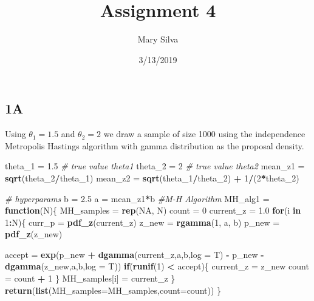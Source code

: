\documentclass[]{article}
\title{Assignment 4}
\author{Mary Silva}
\date{3/13/2019}
\newenvironment{Shaded}{\begin{snugshade}}{\end{snugshade}}
\newcommand{\KeywordTok}[1]{\textcolor[rgb]{0.13,0.29,0.53}{\textbf{#1}}}
\newcommand{\DataTypeTok}[1]{\textcolor[rgb]{0.13,0.29,0.53}{#1}}
\newcommand{\DecValTok}[1]{\textcolor[rgb]{0.00,0.00,0.81}{#1}}
\newcommand{\FloatTok}[1]{\textcolor[rgb]{0.00,0.00,0.81}{#1}}
\newcommand{\StringTok}[1]{\textcolor[rgb]{0.31,0.60,0.02}{#1}}
\newcommand{\CommentTok}[1]{\textcolor[rgb]{0.56,0.35,0.01}{\textit{#1}}}
\newcommand{\OtherTok}[1]{\textcolor[rgb]{0.56,0.35,0.01}{#1}}
\newcommand{\ControlFlowTok}[1]{\textcolor[rgb]{0.13,0.29,0.53}{\textbf{#1}}}
\newcommand{\OperatorTok}[1]{\textcolor[rgb]{0.81,0.36,0.00}{\textbf{#1}}}
\newcommand{\NormalTok}[1]{#1}
\begin{document}
\maketitle

\subsection{1A}\label{a}

Using \(\theta_1 = 1.5\) and \(\theta_2 = 2\) we draw a sample of size
1000 using the independence Metropolis Hastings algorithm with gamma
distribution as the proposal density.

\begin{Shaded}
\begin{Highlighting}[]
\NormalTok{theta_}\DecValTok{1}\NormalTok{ =}\StringTok{ }\FloatTok{1.5} \CommentTok{# true value theta1}
\NormalTok{theta_}\DecValTok{2}\NormalTok{ =}\StringTok{ }\DecValTok{2} \CommentTok{# true value theta2}
\NormalTok{mean_z1 =}\StringTok{ }\KeywordTok{sqrt}\NormalTok{(theta_}\DecValTok{2}\OperatorTok{/}\NormalTok{theta_}\DecValTok{1}\NormalTok{)}
\NormalTok{mean_z2 =}\StringTok{ }\KeywordTok{sqrt}\NormalTok{(theta_}\DecValTok{1}\OperatorTok{/}\NormalTok{theta_}\DecValTok{2}\NormalTok{) }\OperatorTok{+}\StringTok{ }\DecValTok{1}\OperatorTok{/}\NormalTok{(}\DecValTok{2}\OperatorTok{*}\NormalTok{theta_}\DecValTok{2}\NormalTok{)}

\CommentTok{# hyperparams}
\NormalTok{b =}\StringTok{ }\FloatTok{2.5}
\NormalTok{a =}\StringTok{ }\NormalTok{mean_z1}\OperatorTok{*}\NormalTok{b}
\CommentTok{#M-H Algorithm}
\NormalTok{MH_alg1 =}\StringTok{ }\ControlFlowTok{function}\NormalTok{(N)\{}
\NormalTok{  MH_samples =}\StringTok{ }\KeywordTok{rep}\NormalTok{(}\OtherTok{NA}\NormalTok{, N)}
\NormalTok{  count =}\StringTok{ }\DecValTok{0}
\NormalTok{  current_z =}\StringTok{ }\FloatTok{1.0}
  \ControlFlowTok{for}\NormalTok{(i }\ControlFlowTok{in} \DecValTok{1}\OperatorTok{:}\NormalTok{N)\{}
\NormalTok{    curr_p =}\StringTok{ }\KeywordTok{pdf_z}\NormalTok{(current_z) }
\NormalTok{    z_new =}\StringTok{ }\KeywordTok{rgamma}\NormalTok{(}\DecValTok{1}\NormalTok{, a, b)}
\NormalTok{    p_new =}\StringTok{ }\KeywordTok{pdf_z}\NormalTok{(z_new)}
    
\NormalTok{    accept =}\StringTok{ }\KeywordTok{exp}\NormalTok{(p_new }\OperatorTok{+}\StringTok{ }\KeywordTok{dgamma}\NormalTok{(current_z,a,b,}\DataTypeTok{log =}\NormalTok{ T) }\OperatorTok{-}\StringTok{ }
\StringTok{                   }\NormalTok{p_new }\OperatorTok{-}\StringTok{ }\KeywordTok{dgamma}\NormalTok{(z_new,a,b,}\DataTypeTok{log =}\NormalTok{ T))}
    \ControlFlowTok{if}\NormalTok{(}\KeywordTok{runif}\NormalTok{(}\DecValTok{1}\NormalTok{) }\OperatorTok{<}\StringTok{ }\NormalTok{accept)\{}
\NormalTok{      current_z =}\StringTok{ }\NormalTok{z_new}
\NormalTok{      count =}\StringTok{ }\NormalTok{count }\OperatorTok{+}\StringTok{ }\DecValTok{1}
\NormalTok{    \}}
\NormalTok{    MH_samples[i] =}\StringTok{ }\NormalTok{current_z}
\NormalTok{  \}}
  \KeywordTok{return}\NormalTok{(}\KeywordTok{list}\NormalTok{(}\DataTypeTok{MH_samples=}\NormalTok{MH_samples,}\DataTypeTok{count=}\NormalTok{count))}
\NormalTok{\}}
\end{Highlighting}
\end{Shaded}
\end{document}
